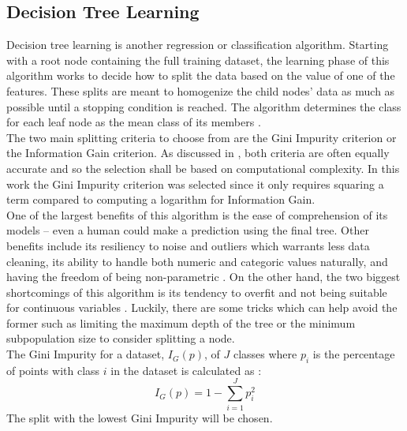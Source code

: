 \documentclass[titlepage]{article}
\begin{document}
\subsection{Decision Tree Learning}
Decision tree learning is another regression or classification algorithm. Starting with a root node containing the full training dataset, the learning phase of this algorithm works to decide how to split the data based on the value of one of the features. These splits are meant to homogenize the child nodes' data as much as possible until a stopping condition is reached. The algorithm determines the class for each leaf node as the mean class of its members \cite{Gini-Index}.\\
The two main splitting criteria to choose from are the Gini Impurity criterion or the Information Gain criterion. As discussed in \cite{Gini-Index}, both criteria are often equally accurate and so the selection shall be based on computational complexity. In this work the Gini Impurity criterion was selected since it only requires squaring a term compared to computing a logarithm for Information Gain.\\
One of the largest benefits of this algorithm is the ease of comprehension of its models -- even a human could make a prediction using the final tree. Other benefits include its resiliency to noise and outliers \cite{DecisionTreeOG} which warrants less data cleaning, its ability to handle both numeric and categoric values naturally, and having the freedom of being non-parametric \cite{DecisionTreeNonPara}. On the other hand, the two biggest shortcomings of this algorithm is its tendency to overfit \cite{DecisionTreeOG} and not being suitable for continuous variables \cite{DecisionTreeOG}. Luckily, there are some tricks which can help avoid the former such as limiting the maximum depth of the tree or the minimum subpopulation size to consider splitting a node.\\
The Gini Impurity for a dataset, $I_G(p)$, of $J$ classes where $p_i$ is the percentage of points with class $i$ in the dataset is calculated as \cite{Gini-Index}:
$$I_G(p) = 1 - \sum\limits_{i=1}^J p_i^2$$
The split with the lowest Gini Impurity will be chosen.
\end{document}
